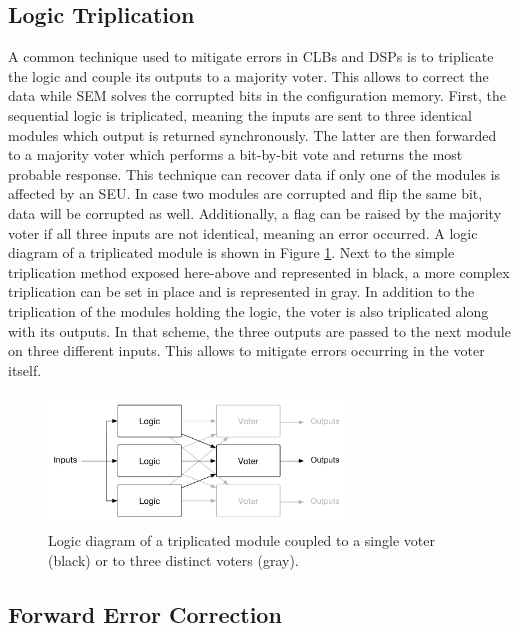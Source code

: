     \subsection{Logic Triplication}

      A common technique used to mitigate errors in CLBs and DSPs is to triplicate the logic and couple its outputs to a majority voter. This allows to correct the data while SEM solves the corrupted bits in the configuration memory. First, the sequential logic is triplicated, meaning the inputs are sent to three identical modules which output is returned synchronously. The latter are then forwarded to a majority voter which performs a bit-by-bit vote and returns the most probable response. This technique can recover data if only one of the modules is affected by an SEU. In case two modules are corrupted and flip the same bit, data will be corrupted as well. Additionally, a flag can be raised by the majority voter if all three inputs are not identical, meaning an error occurred. A logic diagram of a triplicated module is shown in Figure \ref{fig:II-5-tmr}. Next to the simple triplication method exposed here-above and represented in black, a more complex triplication can be set in place and is represented in gray. In addition to the triplication of the modules holding the logic, the voter is also triplicated along with its outputs. In that scheme, the three outputs are passed to the next module on three different inputs. This allows to mitigate errors occurring in the voter itself.

      \begin{figure}[t!]
        \centering
        \includegraphics[width=0.7\textwidth]{img/II-5-irradiation/tmr}
        \caption{Logic diagram of a triplicated module coupled to a single voter (black) or to three distinct voters (gray).}
        \label{fig:II-5-tmr}
      \end{figure}

    \subsection{Forward Error Correction}

